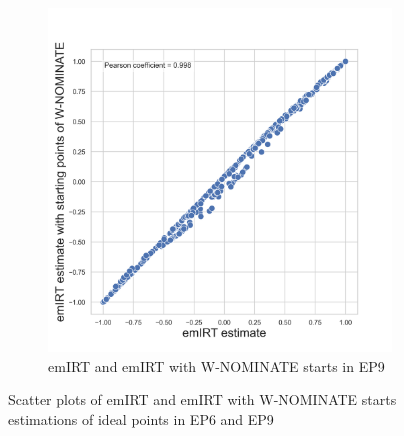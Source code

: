 \documentclass[a4paper,12pt]{report}
\begin{document}
\begin{figure}[H]
\begin{subfigure}[b]{0.48\textwidth}
            \includegraphics[width=\textwidth]{Graphs/ScatterEMEIGEN9}
            \caption{emIRT and emIRT with W-NOMINATE starts in EP9}
            \label{fig:EMEIGEN_SCATTER_9}
        \end{subfigure}
        \caption{Scatter plots of emIRT and emIRT with W-NOMINATE starts estimations of ideal points in EP6 and EP9}
        \label{fig:EMEIGEN_SCATTER_6_9}
    \end{figure}
\end{document}
